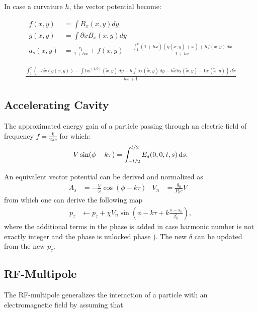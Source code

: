 In case a curvature $h$, the vector potential become:

\begin{align}
f(x,y)&=\int B_x(x,y) dy  \\
g(x,y)&=\int \partial x  B_x(x,y) dy \\
a_s(x,y)&=\frac{c_1}{1 + h x} + f(x,y) -
   \frac{\int_1^x (1 + h \tilde{x}) (g(\tilde{x},y)+\tilde{x}) +h f(x,y)  \, d\tilde{x}}{1+ h x}
\end{align}

\begin{align}
\frac{\int_1^x \left(-h \tilde{x} \left(g(x,y)\right)-\int \text{bx}^{(1,0)}(\tilde{x},y) \, dy-h \int \text{bx}(\tilde{x},y) \,
   dy-h \tilde{x} \text{by}(\tilde{x},y)-\text{by}(\tilde{x},y)\right) \, d\tilde{x}}{h x+1}
\end{align}



\subsection{Accelerating Cavity}

The approximated energy gain of a particle passing through an electric field of frequency $f=\frac{k}{2\pi c}$ for which:
\begin{align}
V \sin(\phi - k \tau) = \int_{-l/2}^{l/2} E_s(0,0,t,s)  {\rm \,d}s.
\end{align}

An equivalent vector potential can be derived and normalized as
\begin{align}
A_s& = - \frac{V}{\omega} \cos(\phi - k \tau ) & 
V_n&=  \frac{q_0}{P_0 c} V  & 
\end{align}
from which one can derive the following map
\begin{align}
p_\tau & \leftarrow p_\tau + \chi V_n \sin(\phi - k \tau + k \frac{s-s_0}{\beta_0}  ),
\end{align}
where the additional terms in the phase is added in case harmonic number is not exactly
integer and the phase is unlocked phase ). The new $\delta$ can be updated from the new $p_\tau$.



\subsection{RF-Multipole}

The RF-multipole generalizes the interaction of a particle with an electromagnetic field by assuming that

